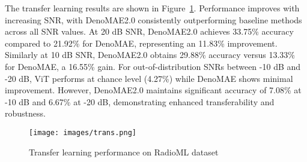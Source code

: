 The transfer learning results are shown in Figure~\ref{fig:trans}. Performance improves with increasing SNR, with DenoMAE2.0 consistently outperforming baseline methods across all SNR values. At 20 dB SNR, DenoMAE2.0 achieves 33.75\% accuracy compared to 21.92\% for DenoMAE, representing an 11.83\% improvement. Similarly at 10 dB SNR, DenoMAE2.0 obtains 29.88\% accuracy versus 13.33\% for DenoMAE, a 16.55\% gain. For out-of-distribution SNRs between -10 dB and -20 dB, ViT performs at chance level (4.27\%) while DenoMAE shows minimal improvement. However, DenoMAE2.0 maintains significant accuracy of 7.08\% at -10 dB and 6.67\% at -20 dB, demonstrating enhanced transferability and robustness.

\begin{figure}[htbp]
    \centering
    \texttt{[image: images/trans.png]}
    \caption{Transfer learning performance on RadioML dataset}
    \label{fig:trans}
\end{figure}

